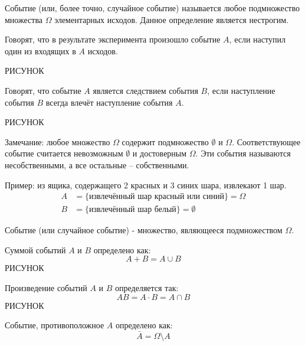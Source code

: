 \documentclass[a4paper, 12pt]{report}
\begin{document}
			Событие (или, более точно, случайное событие) называется любое подмножество множества $\Omega$ элементарных исходов. Данное определение является нестрогим.
			
			Говорят, что в результате эксперимента произошло событие $A$, если наступил один из входящих в $A$ исходов.
			
			РИСУНОК
			
			Говорят, что событие $A$ является следствием события $B$, если наступление события $B$ всегда влечёт наступление события $A$.
			
			РИСУНОК
			
			Замечание: любое множество $\Omega$ содержит подмножество $\emptyset$ и $\Omega$. Соответствующее событие считается невозможным $\emptyset$ и достоверным $\Omega$. Эти события называются несобственными, а все остальные -- собственными.
			
			Пример: из ящика, содержащего 2 красных и 3 синих шара, извлекают 1 шар.
			\begin{subequations}
				\begin{align}
					A&=\{\text{извлечённый шар красный или синий}\}=\Omega \\
					B&=\{\text{извлечённый шар белый}\}=\emptyset
				\end{align}
			\end{subequations}
		
			Событие (или случайное событие) - множество, являющееся подмножеством $\Omega$.
			
			Суммой событий $A$ и $B$ определено как:
			\begin{equation}
				A+B=A\cup B
			\end{equation}
			РИСУНОК
		
			Произведение событий $A$ и $B$ определяется так:
			\begin{equation}
				AB=A\cdot B=A\cap B
			\end{equation}
			РИСУНОК
			
			Событие, противоположное $A$ определено как:
			\begin{equation}
				\bar{A}=\Omega\setminus A
			\end{equation}
		
\end{document}

